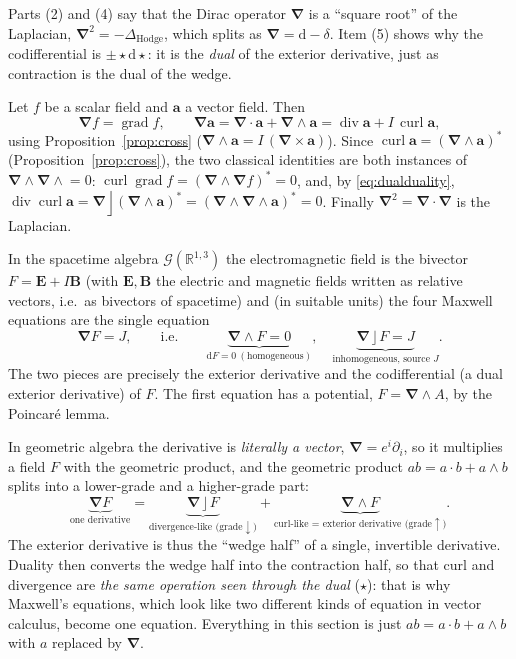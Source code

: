 \documentclass[11pt,a4paper]{article}
\numberwithin{equation}{section}
\theoremstyle{definition}
\theoremstyle{plain}
\newcommand{\R}{\mathbb{R}}
\newcommand{\dd}{\mathrm{d}}
\newcommand{\GA}{\mathcal{G}}
\newcommand{\lc}{\mathbin{\rfloor}}
\newcommand{\pss}{I}
\newcommand{\dual}[1]{#1^{\ast}}
\newcommand{\hodge}{\star}
\newcommand{\codiff}{\delta}
\newcommand{\vd}{\boldsymbol{\nabla}}               %
\begin{document}
\begin{remark}
Parts (2) and (4) say that the Dirac operator $\vd$ is a ``square root'' of the Laplacian, $\vd^2=-\Delta_{\mathrm{Hodge}}$, which splits as $\vd=\dd-\codiff$. Item (5) shows why the codifferential is $\pm\hodge\dd\hodge$: it is the \emph{dual} of the exterior derivative, just as contraction is the dual of the wedge.
\end{remark}

\begin{example}[Vector calculus in $\GA(\R^3)$]
Let $f$ be a scalar field and $\mathbf a$ a vector field. Then
\[
 \vd f=\operatorname{grad}f,\qquad
 \vd\mathbf a=\vd\cdot\mathbf a+\vd\wedge\mathbf a=\operatorname{div}\mathbf a+\pss\,\operatorname{curl}\mathbf a ,
\]
using Proposition~\ref{prop:cross} ($\vd\wedge\mathbf a=\pss\,(\vd\times\mathbf a)$). Since $\operatorname{curl}\mathbf a=\dual{(\vd\wedge\mathbf a)}$ (Proposition~\ref{prop:cross}), the two classical identities are both instances of $\vd\wedge\vd\wedge{}=0$: $\operatorname{curl}\operatorname{grad}f=\dual{(\vd\wedge\vd f)}=0$, and, by \eqref{eq:dualduality},
$\operatorname{div}\operatorname{curl}\mathbf a=\vd\lc\dual{(\vd\wedge\mathbf a)}=\dual{(\vd\wedge\vd\wedge\mathbf a)}=0$. Finally $\vd^2=\vd\cdot\vd$ is the Laplacian.
\end{example}

\begin{example}
In the spacetime algebra $\GA(\R^{1,3})$ the electromagnetic field is the bivector $F=\mathbf E+\pss\mathbf B$ (with $\mathbf E,\mathbf B$ the electric and magnetic fields written as relative vectors, i.e.\ as bivectors of spacetime) and (in suitable units) the four Maxwell equations are the single equation
\[
 \vd F=J ,\qquad\text{i.e.}\qquad \underbrace{\vd\wedge F=0}_{\dd F=0\ (\text{homogeneous})},\quad
 \underbrace{\vd\lc F=J}_{\text{inhomogeneous, source }J}.
\]
The two pieces are precisely the exterior derivative and the codifferential (a dual exterior derivative) of $F$. The first equation has a potential, $F=\vd\wedge A$, by the Poincar\'e lemma.
\end{example}

\begin{intuition}
In geometric algebra the derivative is \emph{literally a vector}, $\vd=e^i\partial_i$, so it multiplies a field $F$ with the geometric product, and the geometric product $ab=a\cdot b+a\wedge b$ splits into a lower-grade and a higher-grade part:
\[
 \underbrace{\vd F}_{\text{one derivative}}=\underbrace{\vd\lc F}_{\text{divergence-like (grade}\downarrow)}+\underbrace{\vd\wedge F}_{\text{curl-like = exterior derivative (grade}\uparrow)} .
\]
The exterior derivative is thus the ``wedge half'' of a single, invertible derivative. Duality then converts the wedge half into the contraction half, so that curl and divergence are \emph{the same operation seen through the dual} ($\hodge$): that is why Maxwell's equations, which look like two different kinds of equation in vector calculus, become one equation. Everything in this section is just $ab=a\cdot b+a\wedge b$ with $a$ replaced by $\vd$.
\end{intuition}
\end{document}
